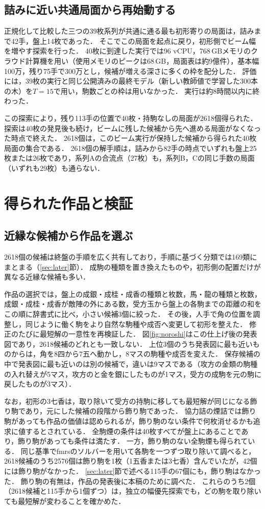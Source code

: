 \documentclass[english,submit]{ipsj}
\begin{document}
\subsection{詰みに近い共通局面から再始動する}
\label{sec:restart}
正規化して比較した三つの39枚系列が共通に通る最も初形寄りの局面は，詰みまで42手，盤上14枚であった．
そこでこの局面を起点に戻り，初形側でビーム幅を増やす探索を行った．
40枚に到達した実行では96 vCPU，768\,GBメモリのクラウド計算機を用い（使用メモリのピークは68\,GB，局面表は約9億件），基本幅100万，残り75手で300万とし，候補が増える深さに多くの枠を配分した．
評価には，39枚の実行と同じ公開済みの最終モデル（新しい教師値で学習した300本の木）を$T=15$で用い，駒数ごとの枠は用いなかった．
実行は約8時間以内に終わった．

この探索により，残り113手の位置で40枚・持駒なしの局面が2618個得られた．
探索は40枚の発見後も続け，ビームに残した候補から先へ進める局面がなくなった時点で終えた．
2618個は，このビーム実行が保持した候補から得られた40枚局面の集合である．
2618個の解手順は，詰みから82手の時点でいずれも盤上25枚または26枚であり，系列Aの合流点（27枚）も，系列B，Cの同じ手数の局面（いずれも29枚）も通らない．

\section{得られた作品と検証}
\label{sec:result}
\subsection{近縁な候補から作品を選ぶ}
2618個の候補は終盤の手順を広く共有しており，手順に基づく分類では169類にまとまる（\ref{sec:later}節）．
成駒の種類を置き換えたものや，初形側の配置だけが異なる近縁な候補も多い．

作品の選択では，盤上の成銀・成桂・成香の種類と枚数，馬・龍の種類と枚数，成銀・成桂・成香が敵陣の外にある数，受方玉から盤上の各駒までの距離の和をこの順に辞書式に比べ，小さい候補3個に絞った．
その後，人手で角の位置を調整し，同じように働く駒をより自然な駒種や成否へ変更して初形を整えた．
修正のたびに最短解の一意性を再検証した．
図\ref{fig:noroshi}はこの仕上げ後の発表図であり，2618候補のどれとも一致しない．
上位3個のうち発表図に最も近いものからは，角を8四から7五へ動かし，8マスの駒種や成否を変えた．
保存候補の中で発表図に最も近いのは別の候補で，違いは9マスである（攻方の金類の駒種の入れ替えが5マス，攻方のと金を銀にしたものが1マス，受方の成駒を元の駒に戻したものが3マス）．

なお，初形の3七香は，取り除いて受方の持駒に移しても最短解が同じになる飾り駒であり，元にした候補の段階から飾り駒であった．
協力詰の煙詰では飾り駒があっても作品の価値は認められるが，飾り駒のない条件で何枚消せるかも追求に値するとされている\cite{wfp218}．
全駒煙の条件は40枚すべてが盤上にあることであり，飾り駒があっても条件は満たす．
一方，飾り駒のない全駒煙も得られている．
同じ基準でfmrsのソルバーを用いて各駒を一つずつ取り除いて調べると，2618候補のうち2576個は飾り駒を1枚（1五香または3七香）含んでいたが，42個には飾り駒がなかった．
\ref{sec:later}節で述べる115手の67個にも，飾り駒はなかった．
飾り駒の有無は，作品の発表後に本稿のために調べた．
これらのうち2個（2618候補と115手から1個ずつ）は，独立の幅優先探索でも，どの駒を取り除いても最短解が変わることを確かめた．
\end{document}
